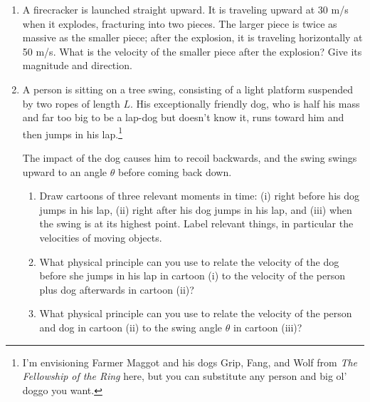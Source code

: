 \documentclass[12pt]{article}
\begin{document}
\Large
\centerline{}

\normalsize
\centerline{}

\bigskip
\bigskip
\begin{enumerate}

\item A firecracker is launched straight upward. It is traveling upward at 30 m/s when it explodes, fracturing into two pieces. The larger piece is twice as massive as the smaller piece; after the explosion, it is traveling horizontally at 50 m/s.
What is the velocity of the smaller piece after the explosion? Give its magnitude and direction.

\newpage

\item A person is sitting on a tree swing, consisting of a light platform suspended by two ropes of length $L$. His exceptionally friendly dog, who is half his mass and far too big to be a lap-dog but doesn't know it, runs toward him 
and then jumps in his lap.\footnote{I'm envisioning Farmer Maggot and his dogs Grip, Fang, and Wolf from {\it The Fellowship of the Ring} here, but you can substitute any person and big ol' doggo you want.}

The impact of the dog causes him to recoil backwards, and the swing swings upward to an angle $\theta$ before coming back down.

\begin{enumerate}

\item Draw cartoons of three relevant moments in time: (i) right before his dog jumps in his lap, (ii) right after his dog jumps in his lap, and (iii) when the swing is at its highest point. Label relevant things, in particular the velocities
of moving objects.

\item What physical principle can you use to relate the velocity of the dog before she jumps in his lap in cartoon (i) to the velocity of the person plus dog afterwards in cartoon (ii)?

\vspace{1in}

\item What physical principle can you use to relate the velocity of the person and dog in cartoon (ii) to the swing angle $\theta$ in cartoon (iii)?

\vspace{1in}


\end{enumerate}
\end{enumerate}
\end{document}
